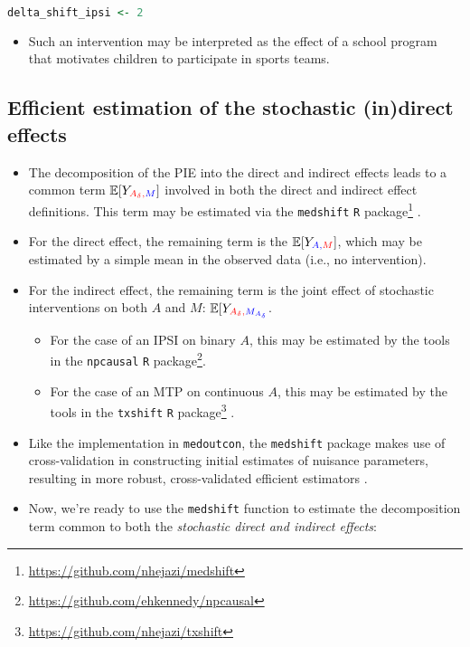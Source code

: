 \documentclass[
  12pt,
]{book}
\newcommand{\passthrough}[1]{#1}
\providecommand{\tightlist}{%
  \setlength{\itemsep}{0pt}\setlength{\parskip}{0pt}}
\renewcommand{\href}[2]{#2\footnote{\url{#1}}}
\theoremstyle{definition}
\theoremstyle{definition}
\theoremstyle{definition}
\newcommand{\E}{\mathbb{E}}
\newcommand{\1}{\mathbbm{1}}
\begin{document}
\begin{lstlisting}[language=R]
delta_shift_ipsi <- 2
\end{lstlisting}

\begin{itemize}
\tightlist
\item
  Such an intervention may be interpreted as the effect of a school program that
  motivates children to participate in sports teams.
\end{itemize}

\hypertarget{efficient-estimation-of-the-stochastic-indirect-effects}{%
\subsection{Efficient estimation of the stochastic (in)direct effects}\label{efficient-estimation-of-the-stochastic-indirect-effects}}

\begin{itemize}
\tightlist
\item
  The decomposition of the PIE into the direct and indirect effects leads to a
  common term \(\E[Y_{\color{red}{A_\delta},\color{blue}{M}}]\) involved in both
  the direct and indirect effect definitions. This term may be estimated via the
  \href{https://github.com/nhejazi/medshift}{\passthrough{\lstinline!medshift!} \passthrough{\lstinline!R!} package}
  \citep{hejazi2020medshift}.
\item
  For the direct effect, the remaining term is the
  \(\E[Y_{\color{blue}{A},\color{red}{M}}]\), which may be estimated by a simple
  mean in the observed data (i.e., no intervention).
\item
  For the indirect effect, the remaining term is the joint effect of stochastic
  interventions on both \(A\) and \(M\):
  \(\E[Y_{\color{red}{A_\delta},\color{blue}{M_{A_\delta}}}\).

  \begin{itemize}
  \tightlist
  \item
    For the case of an IPSI on binary \(A\), this may be estimated by the tools
    in the \href{https://github.com/ehkennedy/npcausal}{\passthrough{\lstinline!npcausal!} \passthrough{\lstinline!R!} package}.
  \item
    For the case of an MTP on continuous \(A\), this may be estimated by the tools
    in the \href{https://github.com/nhejazi/txshift}{\passthrough{\lstinline!txshift!} \passthrough{\lstinline!R!} package}
    \citep{hejazi2020txshift-rpkg, hejazi2020txshift-joss}.
  \end{itemize}
\item
  Like the implementation in \passthrough{\lstinline!medoutcon!}, the \passthrough{\lstinline!medshift!} package makes use of
  cross-validation in constructing initial estimates of nuisance parameters,
  resulting in more robust, cross-validated efficient estimators
  \citep{klaassen1987consistent, zheng2011cross, chernozhukov2018double}.
\item
  Now, we're ready to use the \passthrough{\lstinline!medshift!} function to estimate the decomposition
  term common to both the \emph{stochastic direct and indirect effects}:
\end{itemize}
\end{document}
